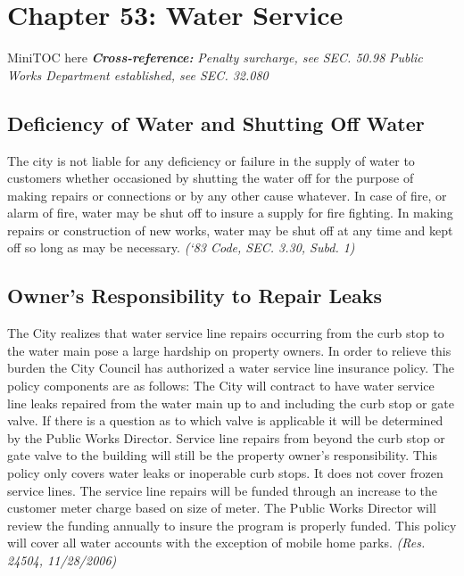 \documentclass[code.tex]{subfiles}
\begin{document}
\chapter*{Chapter 53: \newline
	Water Service}

MiniTOC here\newline
\textbf{\emph{{Cross-reference:}}}\newline
\emph{Penalty surcharge, see SEC. 50.98}\newline
\emph{Public Works Department established, see SEC. 32.080}
\pagebreak

\section{Deficiency of Water and Shutting Off Water}
The city is not liable for any deficiency or failure in the supply of water to customers whether occasioned by shutting the water off for the purpose of making repairs or connections or by any other cause whatever.  In case of fire, or alarm of fire, water may be shut off to insure a supply for fire fighting.  In making repairs or construction of new works, water may be shut off at any time and kept off so long as may be necessary.\newline
\emph{(‘83 Code, SEC. 3.30, Subd. 1)}
\section{Owner's Responsibility to Repair Leaks}
The City realizes that water service line repairs occurring from the curb stop to the water main pose a large hardship on property owners.  In order to relieve this burden the City Council has authorized a water service line insurance policy.  The policy components are as follows:  The City will contract to have water service line leaks repaired from the water main up to and including the curb stop or gate valve.  If there is a question as to which valve is applicable it will be determined by the Public Works Director. Service line repairs from beyond the curb stop or gate valve to the building will still be the property owner’s responsibility.  This policy only covers water leaks or inoperable curb stops.  It does not cover frozen service lines.  The service line repairs will be funded through an increase to the customer meter charge based on size of meter. The Public Works Director will review the funding annually to insure the program is properly funded.  This policy will cover all water accounts with the exception of mobile home parks.\newline
\emph{(Res. 24504, 11/28/2006)}
\end{document}
